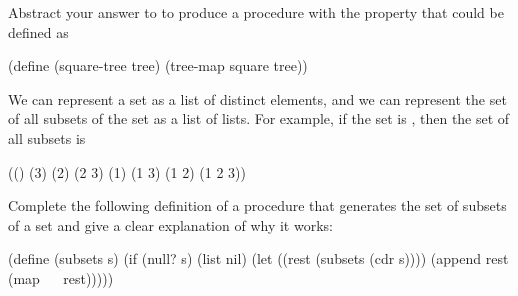 \begin{exercise}
	\label{Exercise 2.31}
	Abstract your answer to  to produce a procedure  with the property that  could be defined as
	\begin{scheme}
	  (define (square-tree tree) (tree-map square tree))
	\end{scheme}
\end{exercise}



\begin{exercise}
	\label{Exercise 2.32}
	We can represent a set as a list of distinct elements, and we can represent the set of all subsets of the set as a list of lists.
	For example, if the set is , then the set of all subsets is
	\begin{example}
	  (() (3) (2) (2 3) (1) (1 3) (1 2) (1 2 3))
	\end{example}
	Complete the following definition of a procedure that generates the set of subsets of a set and give a clear explanation of why it works:
	\begin{scheme}
	  (define (subsets s)
	    (if (null? s)
	        (list nil)
	        (let ((rest (subsets (cdr s))))
	        (append rest (map ~~ rest)))))
	\end{scheme}
\end{exercise}

